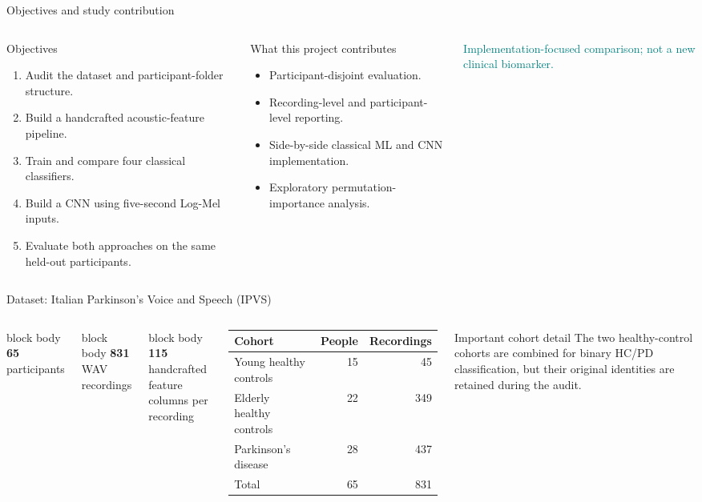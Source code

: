 \documentclass[aspectratio=169,10pt]{beamer}
\newcommand{\metric}[2]{%
  \begin{beamercolorbox}[sep=8pt,center,wd=\linewidth]{block body}%
    {\color{Teal}\fontsize{23}{25}\selectfont\bfseries #1}\\[-1pt]
    {\color{Muted}\scriptsize #2}%
  \end{beamercolorbox}%
}
\begin{document}
\begin{frame}{Objectives and study contribution}
\begin{columns}[T,onlytextwidth]
\begin{block}{Objectives}
\begin{enumerate}
\item Audit the dataset and participant-folder structure.
\item Build a handcrafted acoustic-feature pipeline.
\item Train and compare four classical classifiers.
\item Build a CNN using five-second Log-Mel inputs.
\item Evaluate both approaches on the same held-out participants.
\end{enumerate}
\end{block}
\begin{block}{What this project contributes}
\begin{itemize}
\item Participant-disjoint evaluation.
\item Recording-level and participant-level reporting.
\item Side-by-side classical ML and CNN implementation.
\item Exploratory permutation-importance analysis.
\end{itemize}
\end{block}
\vspace{2mm}
\centering\small\textcolor{Teal}{Implementation-focused comparison; not a new clinical biomarker.}
\end{columns}
\end{frame}

\begin{frame}{Dataset: Italian Parkinson's Voice and Speech (IPVS)}\sloppy
\begin{columns}[T,onlytextwidth]
\metric{65}{participants}\vspace{2mm}
\metric{831}{WAV recordings}\vspace{2mm}
\metric{115}{handcrafted feature columns per recording}
\centering
\begin{tabular}{lrr}
\toprule
\textbf{Cohort} & \textbf{People} & \textbf{Recordings}\\
\midrule
Young healthy controls & 15 & 45\\
Elderly healthy controls & 22 & 349\\
Parkinson's disease & 28 & 437\\
\midrule
Total & 65 & 831\\
\bottomrule
\end{tabular}
\vspace{3mm}
\begin{alertblock}{Important cohort detail}
\small The two healthy-control cohorts are combined for binary HC/PD classification, but their original identities are retained during the audit.
\end{alertblock}
\end{columns}
\end{frame}
\end{document}

